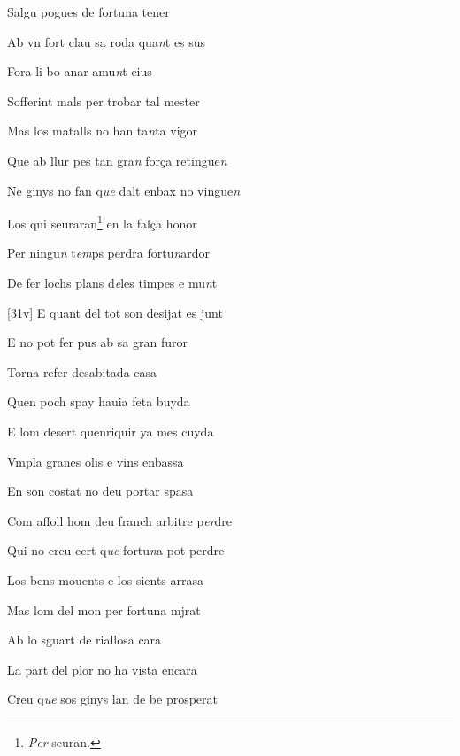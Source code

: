 \documentclass[12pt]{article}
\begin{document}
\begin{estrofa}

 Salgu pogues de fortuna tener

 Ab vn fort clau sa roda qua\textit{n}t es sus

 Fora li bo anar amu\textit{n}t eius

 Sofferint mals per trobar tal mester

 Mas los matalls no han ta\textit{n}ta vigor

 Que ab llur pes tan gra\textit{n} for\c{c}a retingue\textit{n}

 Ne ginys no fan q\textit{ue} dalt enbax no vingue\textit{n}

 Los qui seuraran\footnote{\textit{Per} seuran.} en la fal\c{c}a honor

\end{estrofa}



\begin{estrofa}

 Per ningu\textit{n} t\textit{em}ps perdra fortu\textit{n}ardor

 De fer lochs plans d\textit{e}les timpes e mu\textit{n}t

 [31v] E quant del tot son desijat es junt

 E no pot fer pus ab sa gran furor

 Torna refer desabitada casa

 Quen poch spay hauia feta buyda

 E lom desert quenriquir ya mes cuyda

 Vmpla granes olis e vins enbassa

\end{estrofa}



\begin{estrofa}

 En son costat no deu portar spasa

 Com affoll hom deu franch arbitre p\textit{er}dre

 Qui no creu cert q\textit{ue} fortu\textit{n}a pot perdre

 Los bens mouents e los sients arrasa

 Mas lom del mon per fortuna mjrat

 Ab lo sguart de riallosa cara

 La part del plor no ha vista encara

 Creu q\textit{ue} sos ginys lan de be prosperat

\end{estrofa}
\end{document}
